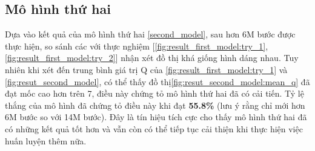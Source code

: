 \subsection{Mô hình thứ hai}
Dựa vào kết quả của mô hình thứ hai \ref{second_model}, sau hơn 6M bước được thực hiện, so sánh các với thực nghiệm [\ref{fig:result_first_model:try_1}, \ref{fig:result_first_model:try_2}] nhận xét đồ thị khá giống hình dáng nhau. Tuy nhiên khi xét đến trung bình giá trị Q của \ref{fig:result_first_model:try_1} và \ref{fig:resut_second_model}, có thể thấy đồ thị\ref{fig:resut_second_model:mean_q} đã đạt mốc cao hơn trên 7, điều này chứng tỏ mô hình thứ hai đã có cải tiến. Tỷ lệ thắng của mô hình đã chứng tỏ điều này khi đạt \textbf{55.8\%} (lưu ý rằng chỉ mới hơn 6M bước so với 14M bước). Đây là tín hiệu tích cực cho thấy mô hình thứ hai đã có những kết quả tốt hơn và vẫn còn có thể tiếp tục cải thiện khi thực hiện việc huấn luyện thêm nữa.
